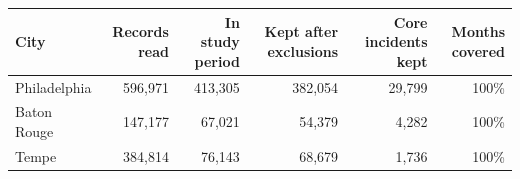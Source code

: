 \begin{tabular}{lrrrrr}
\toprule
City & Records read & In study period & Kept after exclusions & Core incidents kept & Months covered \\
\midrule
Philadelphia & 596,971 & 413,305 & 382,054 & 29,799 & 100\% \\
Baton Rouge & 147,177 & 67,021 & 54,379 & 4,282 & 100\% \\
Tempe & 384,814 & 76,143 & 68,679 & 1,736 & 100\% \\
\bottomrule
\end{tabular}

